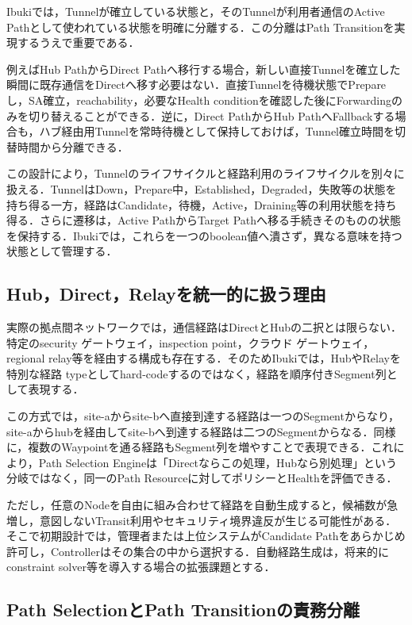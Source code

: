\documentclass[11pt,a4paper,twoside]{ltjsarticle}
\begin{document}
Ibukiでは，Tunnelが確立している状態と，そのTunnelが利用者通信のActive Pathとして使われている状態を明確に分離する．この分離はPath Transitionを実現するうえで重要である．

例えばHub PathからDirect Pathへ移行する場合，新しい直接Tunnelを確立した瞬間に既存通信をDirectへ移す必要はない．直接Tunnelを待機状態でPrepareし，SA確立，reachability，必要なHealth conditionを確認した後にForwardingのみを切り替えることができる．逆に，Direct PathからHub PathへFallbackする場合も，ハブ経由用Tunnelを常時待機として保持しておけば，Tunnel確立時間を切替時間から分離できる．

この設計により，Tunnelのライフサイクルと経路利用のライフサイクルを別々に扱える．TunnelはDown，Prepare中，Established，Degraded，失敗等の状態を持ち得る一方，経路はCandidate，待機，Active，Draining等の利用状態を持ち得る．さらに遷移は，Active PathからTarget Pathへ移る手続きそのものの状態を保持する．Ibukiでは，これらを一つのboolean値へ潰さず，異なる意味を持つ状態として管理する．

\subsection{Hub，Direct，Relayを統一的に扱う理由}

実際の拠点間ネットワークでは，通信経路はDirectとHubの二択とは限らない．特定のsecurity ゲートウェイ，inspection point，クラウド ゲートウェイ，regional relay等を経由する構成も存在する．そのためIbukiでは，HubやRelayを特別な経路 typeとしてhard-codeするのではなく，経路を順序付きSegment列として表現する．

この方式では，site-aからsite-bへ直接到達する経路は一つのSegmentからなり，site-aからhubを経由してsite-bへ到達する経路は二つのSegmentからなる．同様に，複数のWaypointを通る経路もSegment列を増やすことで表現できる．これにより，Path Selection Engineは「Directならこの処理，Hubなら別処理」という分岐ではなく，同一のPath Resourceに対してポリシーとHealthを評価できる．

ただし，任意のNodeを自由に組み合わせて経路を自動生成すると，候補数が急増し，意図しないTransit利用やセキュリティ境界違反が生じる可能性がある．そこで初期設計では，管理者または上位システムがCandidate Pathをあらかじめ許可し，Controllerはその集合の中から選択する．自動経路生成は，将来的にconstraint solver等を導入する場合の拡張課題とする．

\subsection{Path SelectionとPath Transitionの責務分離}
\end{document}

